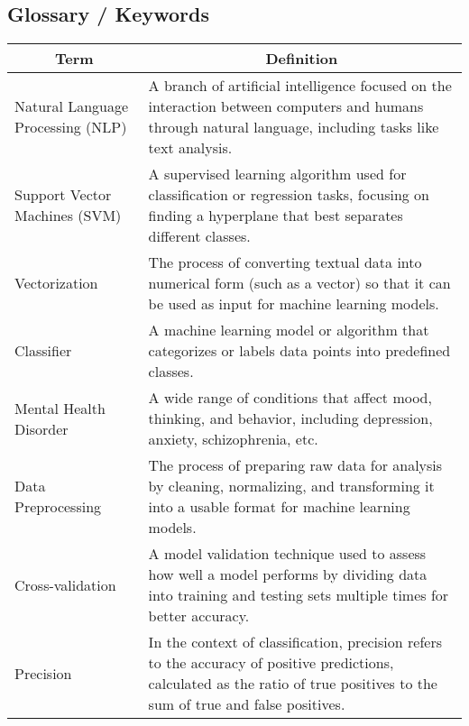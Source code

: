 \pagebreak

\subsection{Glossary / Keywords}
\noindent

\begin{center}

\begin{tabular}{|p{4cm}|p{10cm}|}
  \hline
  \multicolumn{1}{|c|}{\textbf{Term}} & \multicolumn{1}{c|}{\textbf{Definition}} \\

  \hline 
  Natural Language Processing (NLP) & A branch of artificial intelligence focused on the interaction between computers and humans through natural language, including tasks like text analysis. \\

  \hline 
  Support Vector Machines (SVM) & A supervised learning algorithm used for classification or regression tasks, focusing on finding a hyperplane that best separates different classes. \\

  \hline 
  Vectorization & The process of converting textual data into numerical form (such as a vector) so that it can be used as input for machine learning models. \\

  \hline 
  Classifier & A machine learning model or algorithm that categorizes or labels data points into predefined classes. \\

  \hline
  Mental Health Disorder & A wide range of conditions that affect mood, thinking, and behavior, including depression, anxiety, schizophrenia, etc. \\

  \hline
  Data Preprocessing & The process of preparing raw data for analysis by cleaning, normalizing, and transforming it into a usable format for machine learning models. \\

  \hline 
  Cross-validation & A model validation technique used to assess how well a model performs by dividing data into training and testing sets multiple times for better accuracy. \\

  \hline
  Precision & In the context of classification, precision refers to the accuracy of positive predictions, calculated as the ratio of true positives to the sum of true and false positives. \\


\end{tabular}
\end{center}

